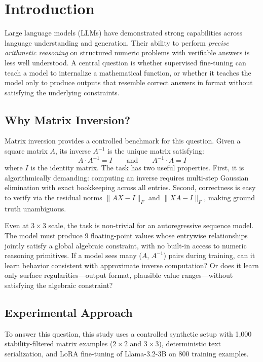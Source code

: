 \section{Introduction}

Large language models (LLMs) have demonstrated strong capabilities across language understanding and generation. Their ability to perform \emph{precise arithmetic reasoning} on structured numeric problems with verifiable answers is less well understood. A central question is whether supervised fine-tuning can teach a model to internalize a mathematical function, or whether it teaches the model only to produce outputs that resemble correct answers in format without satisfying the underlying constraints.

\subsection{Why Matrix Inversion?}

Matrix inversion provides a controlled benchmark for this question. Given a square matrix $A$, its inverse $A^{-1}$ is the unique matrix satisfying:
\[
A \cdot A^{-1} = I \qquad \text{and} \qquad A^{-1} \cdot A = I
\]
where $I$ is the identity matrix. The task has two useful properties. First, it is algorithmically demanding: computing an inverse requires multi-step Gaussian elimination with exact bookkeeping across all entries. Second, correctness is easy to verify via the residual norms $\|AX - I\|_F$ and $\|XA - I\|_F$, making ground truth unambiguous.

Even at $3 \times 3$ scale, the task is non-trivial for an autoregressive sequence model. The model must produce 9 floating-point values whose entrywise relationships jointly satisfy a global algebraic constraint, with no built-in access to numeric reasoning primitives. If a model sees many ($A$, $A^{-1}$) pairs during training, can it learn behavior consistent with approximate inverse computation? Or does it learn only surface regularities---output format, plausible value ranges---without satisfying the algebraic constraint?

\subsection{Experimental Approach}

To answer this question, this study uses a controlled synthetic setup with 1{,}000 stability-filtered matrix examples ($2 \times 2$ and $3 \times 3$), deterministic text serialization, and LoRA fine-tuning of Llama-3.2-3B on 800 training examples.

